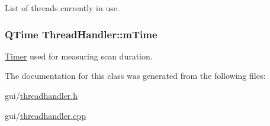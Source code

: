 List of threads currently in use. 

\hypertarget{class_thread_handler_a85fdecdb5c52732ef77a9b03a7201643}{
\subsubsection[{m\-Time}]{\setlength{\rightskip}{0pt plus 5cm}Q\-Time Thread\-Handler\-::m\-Time\hspace{0.3cm}{\ttfamily [protected]}}}\label{class_thread_handler_a85fdecdb5c52732ef77a9b03a7201643}


\hyperlink{class_timer}{Timer} used for measuring scan duration. 



The documentation for this class was generated from the following files\-:\begin{DoxyCompactItemize}
\item 
gui/\hyperlink{threadhandler_8h}{threadhandler.\-h}\item 
gui/\hyperlink{threadhandler_8cpp}{threadhandler.\-cpp}\end{DoxyCompactItemize}

